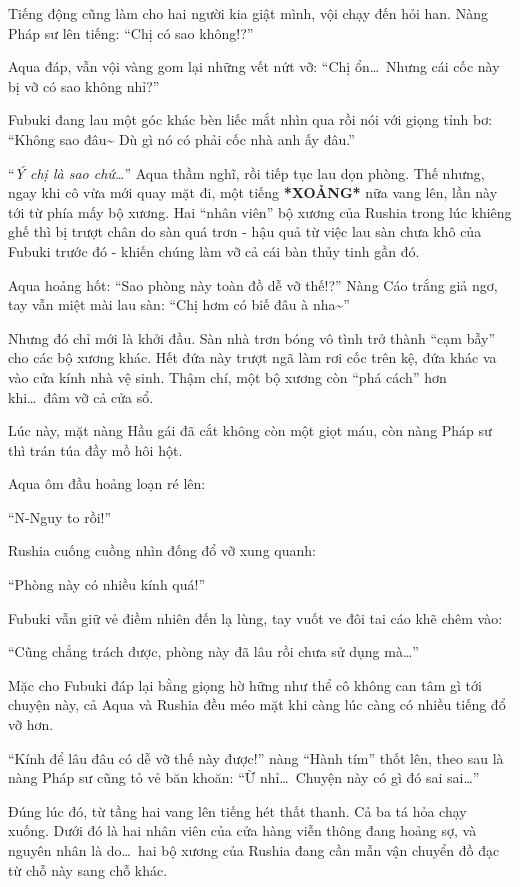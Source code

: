 \documentclass[../main.tex]{subfiles}
\begin{document}
Tiếng động cũng làm cho hai người kia giật mình, vội chạy đến hỏi han. Nàng Pháp sư lên tiếng: ``Chị có sao không!?''

Aqua đáp, vẫn vội vàng gom lại những vết nứt vỡ: ``Chị ổn\dots\ Nhưng cái cốc này bị vỡ có sao không nhỉ?''

Fubuki đang lau một góc khác bèn liếc mắt nhìn qua rồi nói với giọng tỉnh bơ: ``Không sao đâu\~{} Dù gì nó có phải cốc nhà anh ấy đâu.''

``\textit{Ý chị là sao chứ\dots}'' Aqua thầm nghĩ, rồi tiếp tục lau dọn phòng. Thế nhưng, ngay khi cô vừa mới quay mặt đi, một tiếng \textbf{*XOẢNG*} nữa vang lên, lần này tới từ phía mấy bộ xương. Hai ``nhân viên'' bộ xương của Rushia trong lúc khiêng ghế thì bị trượt chân do sàn quá trơn - hậu quả từ việc lau sàn chưa khô của Fubuki trước đó - khiến chúng làm vỡ cả cái bàn thủy tinh gần đó.

Aqua hoảng hốt: ``Sao phòng này toàn đồ dễ vỡ thế!?'' Nàng Cáo trắng giả ngơ, tay vẫn miệt mài lau sàn: ``Chị hơm có biế đâu à nha\~{}''

Nhưng đó chỉ mới là khởi đầu. Sàn nhà trơn bóng vô tình trở thành ``cạm bẫy'' cho các bộ xương khác. Hết đứa này trượt ngã làm rơi cốc trên kệ, đứa khác va vào cửa kính nhà vệ sinh. Thậm chí, một bộ xương còn ``phá cách'' hơn khi\dots\ đâm vỡ cả cửa sổ.

Lúc này, mặt nàng Hầu gái đã cắt không còn một giọt máu, còn nàng Pháp sư thì trán túa đầy mồ hôi hột.

Aqua ôm đầu hoảng loạn ré lên:

``N-Nguy to rồi!''

Rushia cuống cuồng nhìn đống đổ vỡ xung quanh:

``Phòng này có nhiều kính quá!''

Fubuki vẫn giữ vẻ điềm nhiên đến lạ lùng, tay vuốt ve đôi tai cáo khẽ chêm vào:

``Cũng chẳng trách được, phòng này đã lâu rồi chưa sử dụng mà\dots''

Mặc cho Fubuki đáp lại bằng giọng hờ hững như thể cô không can tâm gì tới chuyện này, cả Aqua và Rushia đều méo mặt khi càng lúc càng có nhiều tiếng đổ vỡ hơn.

``Kính để lâu đâu có dễ vỡ thế này được!'' nàng ``Hành tím'' thốt lên, theo sau là nàng Pháp sư cũng tỏ vẻ băn khoăn: ``Ừ nhỉ\dots\ Chuyện này có gì đó sai sai\dots''

Đúng lúc đó, từ tầng hai vang lên tiếng hét thất thanh. Cả ba tá hỏa chạy xuống. Dưới đó là hai nhân viên của cửa hàng viễn thông đang hoảng sợ, và nguyên nhân là do\dots\ hai bộ xương của Rushia đang cần mẫn vận chuyển đồ đạc từ chỗ này sang chỗ khác.
\end{document}
